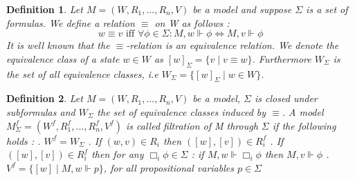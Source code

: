 \documentclass[12pt, a4paper]{scrartcl}
\newtheorem{definition}{Definition}[subsection]
\begin{document}
\begin{definition}
    Let $M = (W,R_1,...,R_n,V)$ be a model and suppose $\Sigma$ is a set of formulas. We define a relation $\equiv$ on W as follows : \newline 
    $$w \equiv v \mbox{ iff } \forall \phi \in \Sigma : M,w \Vdash \phi \Leftrightarrow M,v \Vdash \phi$$ 
    It is well known that the $\equiv$-relation is an equivalence relation. We denote the equivalence class of a state $w\in W$ as $[w]_\Sigma = \{v \mid v \equiv w\}$. Furthermore $W_\Sigma$ is the set of all equivalence classes, i.e
    $W_\Sigma = \{[w]_\Sigma \mid w \in W\}$.    
\end{definition}

\begin{definition}
    Let $M = (W,R_1,...,R_n,V)$ be a model, $\Sigma$ is closed under subformulas and $W_\Sigma$ the set of equivalence classes induced by $\equiv$.
    A model $M^f_\Sigma = (W^f, R_1^f,...,R_n^f, V^f)$ is called filtration of M through $\Sigma$ if the following holds : \newline {}. $W^f = W_\Sigma$ . If $(w,v) \in R_i$ then $([w],[v]) \in R^f_i$ . If $([w], [v]) \in R^f_i$ then for any $\Box_i \phi \in \Sigma$ : if $M,w \Vdash \Box_i \phi$ then $M,v \Vdash \phi$  . $V^f = \{[w] \mid M,w \Vdash p\}$, for all propositional variables $p \in \Sigma$      
\end{definition}
\end{document}
